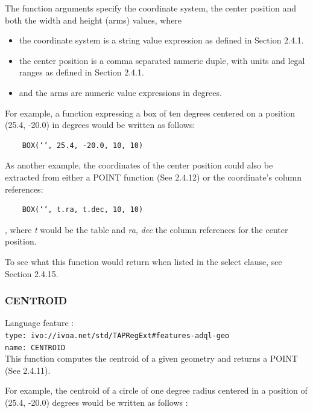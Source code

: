 \documentclass[11pt,a4paper]{ivoa}
\begin{document}
The function arguments specify the coordinate system, the center position
and both the width and height (arms) values, where

\begin{itemize}
    \item the coordinate system is a string value expression as defined in Section 2.4.1.
    \item the center position is a comma separated numeric duple, with units and legal ranges as defined in Section 2.4.1.
    \item and the arms are numeric value expressions in degrees.
\end{itemize}

For example, a function expressing a box of ten degrees centered on a position
(25.4, -20.0) in degrees would be written as follows:

\begin{verbatim}
    BOX(‘’, 25.4, -20.0, 10, 10)
\end{verbatim}

As another example, the coordinates of the center position could also be
extracted from either a POINT function (See 2.4.12) or the coordinate’s
column references:

\begin{verbatim}
    BOX(‘’, t.ra, t.dec, 10, 10)
\end{verbatim}

, where \textit{t} would be the table and \textit{ra}, \textit{dec} the
column references for the center position.

To see what this function would return when listed in the select clause,
see Section 2.4.15.

\subsubsection{CENTROID}
\label{sec:geom.functions.centroid}
{\footnotesize Language feature :}\\
{\footnotesize \verb|type: ivo://ivoa.net/std/TAPRegExt#features-adql-geo|}\\
{\footnotesize \verb|name: CENTROID|}\\

This function computes the centroid of a given geometry and returns a POINT
(See 2.4.11).

For example, the centroid of a circle of one degree radius centered in a
position of (25.4, -20.0) degrees would be written as follows :
\end{document}
